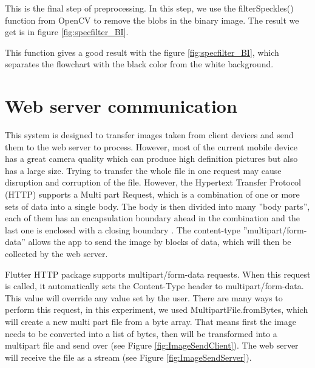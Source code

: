 This is the final step of preprocessing. In this step, we use the filterSpeckles() function from OpenCV to remove the blobs in the binary image. The result we get is in figure \ref{fig:specfilter_BI}.

This function gives a good result with the figure \ref{fig:specfilter_BI}, which separates the flowchart with the black color from the white background.

\section{Web server communication}
This system is designed to transfer images taken from client devices and send them to the web server to process. However, most of the current mobile device has a great camera quality which can produce high definition pictures but also has a large size. Trying to transfer the whole file in one request may cause disruption and corruption of the file. However, the Hypertext Transfer Protocol (HTTP) supports a Multi part Request, which is a combination of one or more sets of data into a single body. The body is then divided into many ''body parts'', each of them has an encapsulation boundary ahead in the combination and the last one is enclosed with a closing boundary \cite{58}. The content-type ''multipart/form-data'' allows the app to send the image by blocks of data, which will then be collected by the web server.

Flutter HTTP package supports multipart/form-data requests. When this request is called, it automatically sets the Content-Type header to multipart/form-data. This value will override any value set by the user. There are many ways to perform this request, in this experiment, we used MultipartFile.fromBytes, which will create a new multi part file from a byte array. That means first the image needs to be converted into a list of bytes, then will be transformed into a multipart file and send over (see Figure \ref{fig:ImageSendClient}). The web server will receive the file as a stream (see Figure \ref{fig:ImageSendServer}).

